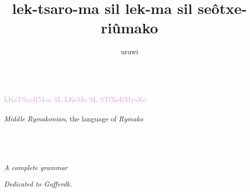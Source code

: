 \documentclass{book}
\title{lek-\bs{}tsaro-ma sil lek-ma sil se\^otxe-\bs{}ri\^umako}
\author{uruwi}
\newcommand{\lname}{Middle Rymakonian}
\begin{document}
\pagecolor{Thistle!25}

\begin{titlepage}
    \makeatletter
    \begin{center}
        {\color{Orchid} \hprule \vspace{1.5ex} \\}
        {\Huge \ltfont \textcolor{Plum}{LKe\bs{}TSxaRMoa SL LKeMa SL STfXe\bs{}RMyaKo}\\}
        {\large \kardinal \textcolor{Purple}{\@title} \\}
        {\large \textit{\lname}, the language of \textit{Rymako} \\}
        {\color{Orchid} \hprule \vspace{1.5ex} \\}
        \vspace{1.5cm}
        {\Large\bfseries \@author}\\[5pt]
        \vspace{2cm}
        {\Large{}} \\
         \\[5pt]
        \emph{A complete grammar}\\[2cm]
        \vfill
        \vfill
        {\@date}
    \end{center}
    \makeatother
\end{titlepage}

\pagecolor{Thistle!15}

\begin{center}
    \textit{Dedicated to Gufferdk.}
\end{center}
\end{document}

